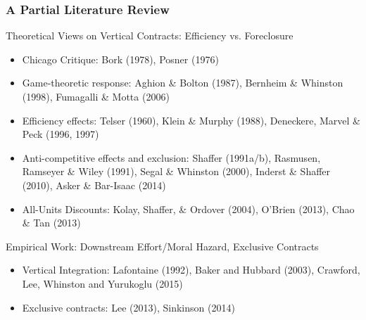 \documentclass[aspectratio=169,11pt]{beamer}
\begin{document}
\begin{frame}
\frametitle{A Partial Literature Review}
\small
Theoretical Views on Vertical Contracts: Efficiency vs. Foreclosure
\footnotesize
\begin{itemize}
\item Chicago Critique: Bork (1978), Posner (1976)
\item Game-theoretic response: Aghion \& Bolton (1987), Bernheim \& Whinston (1998), Fumagalli \& Motta (2006)
\item Efficiency effects: Telser (1960), Klein \& Murphy (1988), Deneckere, Marvel \& Peck (1996, 1997)
\item Anti-competitive effects and exclusion: Shaffer (1991a/b), Rasmusen, Ramseyer \& Wiley (1991), Segal \& Whinston (2000), Inderst \& Shaffer (2010), Asker \& Bar-Isaac (2014)
\item All-Units Discounts: Kolay, Shaffer, \& Ordover (2004), O'Brien (2013), Chao \& Tan (2013)
\end{itemize}
\small
Empirical Work: Downstream Effort/Moral Hazard, Exclusive Contracts
\footnotesize
\begin{itemize}
\item Vertical Integration: Lafontaine (1992), Baker and Hubbard (2003), Crawford, Lee, Whinston and Yurukoglu (2015)
\item Exclusive contracts: Lee (2013), Sinkinson (2014)
\end{itemize}
\end{frame}


\end{document}
